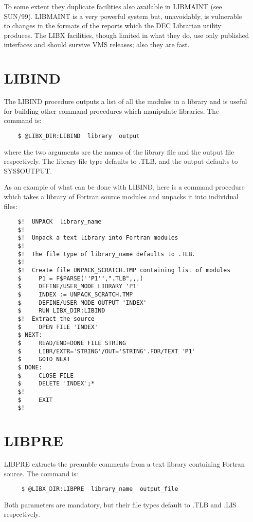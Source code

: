 To some extent they duplicate facilities also available in
LIBMAINT (see SUN/99).  LIBMAINT is a very powerful system
but, unavoidably, is vulnerable to changes in the formats
of the reports which the DEC Librarian utility produces.
The LIBX facilities, though limited in what they
do, use only published interfaces and should survive
VMS releases;  also they are fast.

\section{LIBIND}

The LIBIND procedure
outputs a list of all the modules in a library and is
useful for building other command procedures which manipulate
libraries.  The command is:
\begin{verbatim}
    $ @LIBX_DIR:LIBIND  library  output
\end{verbatim}
where the two arguments are the names of the library file and the
output file respectively.
The library file type defaults to .TLB,
and the output defaults to SYS\$OUTPUT.

As an example of what can be done with LIBIND, here is a command
procedure which takes a library of Fortran source modules and
unpacks it into individual files:
\begin{verbatim}
    $!  UNPACK  library_name
    $!
    $!  Unpack a text library into Fortran modules
    $!
    $!  The file type of library_name defaults to .TLB.
    $!
    $!  Create file UNPACK_SCRATCH.TMP containing list of modules
    $     P1 = F$PARSE(''P1'',".TLB",,,)
    $     DEFINE/USER_MODE LIBRARY 'P1'
    $     INDEX := UNPACK_SCRATCH.TMP
    $     DEFINE/USER_MODE OUTPUT 'INDEX'
    $     RUN LIBX_DIR:LIBIND
    $!  Extract the source
    $     OPEN FILE 'INDEX'
    $ NEXT:
    $     READ/END=DONE FILE STRING
    $     LIBR/EXTR='STRING'/OUT='STRING'.FOR/TEXT 'P1'
    $     GOTO NEXT
    $ DONE:
    $     CLOSE FILE
    $     DELETE 'INDEX';*
    $!
    $     EXIT
    $!
\end{verbatim}

\section{LIBPRE}

LIBPRE extracts the preamble comments from a text library containing
Fortran source.  The command is:
\begin{verbatim}
     $ @LIBX_DIR:LIBPRE  library_name  output_file
\end{verbatim}
Both parameters are mandatory, but their file types
default to .TLB and .LIS respectively.


